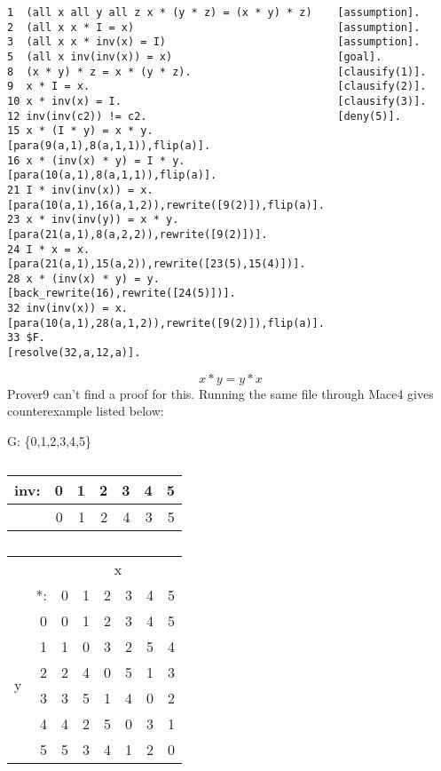 \documentclass[12pt]{article}
\begin{document}
\begin{lstlisting}
1  (all x all y all z x * (y * z) = (x * y) * z)    [assumption].
2  (all x x * I = x)                                [assumption].
3  (all x x * inv(x) = I)                           [assumption].
5  (all x inv(inv(x)) = x)                          [goal].
8  (x * y) * z = x * (y * z).                       [clausify(1)].
9  x * I = x.                                       [clausify(2)].
10 x * inv(x) = I.                                  [clausify(3)].
12 inv(inv(c2)) != c2.                              [deny(5)].
15 x * (I * y) = x * y.                             [para(9(a,1),8(a,1,1)),flip(a)].
16 x * (inv(x) * y) = I * y.                        [para(10(a,1),8(a,1,1)),flip(a)].
21 I * inv(inv(x)) = x.                             [para(10(a,1),16(a,1,2)),rewrite([9(2)]),flip(a)].
23 x * inv(inv(y)) = x * y.                         [para(21(a,1),8(a,2,2)),rewrite([9(2)])].
24 I * x = x.                                       [para(21(a,1),15(a,2)),rewrite([23(5),15(4)])].
28 x * (inv(x) * y) = y.                            [back_rewrite(16),rewrite([24(5)])].
32 inv(inv(x)) = x.                                 [para(10(a,1),28(a,1,2)),rewrite([9(2)]),flip(a)].
33 $F.                                              [resolve(32,a,12,a)].
\end{lstlisting}

\vspace{3mm}

\begin{equation*}
    x * y = y * x
\end{equation*}
Prover9 can't find a proof for this. Running the same file through Mace4 gives 
counterexample listed below:

\begin{table}[H]  \centering %
G: \{0,1,2,3,4,5\} \hspace{.5cm}
\begin{tabular}{r|rrrrrr}
inv: & 0 & 1 & 2 & 3 & 4 & 5\\
\hline
   & 0 & 1 & 2 & 4 & 3 & 5
\end{tabular} \hspace{.5cm}
\begin{tabular}{rr|rrrrrr}
& & \multicolumn{6}{c}{x} \\  
& *: & 0 & 1 & 2 & 3 & 4 & 5\\
\hline
\multirow{6}{*}{y} & 0 & 0 & 1 & 2 & 3 & 4 & 5 \\
     & 1 & 1 & 0 & 3 & 2 & 5 & 4 \\
     & 2 & 2 & 4 & 0 & 5 & 1 & 3 \\
     & 3 & 3 & 5 & 1 & 4 & 0 & 2 \\
     & 4 & 4 & 2 & 5 & 0 & 3 & 1 \\
     & 5 & 5 & 3 & 4 & 1 & 2 & 0
\end{tabular}
\caption{ }
\end{table} 
\end{document}
